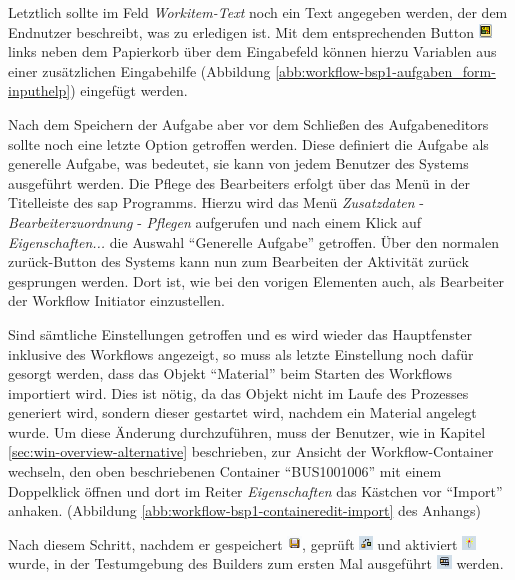 Letztlich sollte im Feld \textit{Workitem-Text} noch ein Text angegeben werden, der dem Endnutzer beschreibt, was zu erledigen ist. Mit dem entsprechenden Button \includegraphics[height=1em]{grafiken/wf-builder_bsp1_formular-aufgabe_btn_eingabehilfe-ausdruck.png} links neben dem Papierkorb über dem Eingabefeld können hierzu Variablen aus einer zusätzlichen Eingabehilfe (Abbildung \ref{abb:workflow-bsp1-aufgaben_form-inputhelp}) eingefügt werden.

Nach dem Speichern der Aufgabe aber vor dem Schließen des Aufgabeneditors sollte noch eine letzte Option getroffen werden. Diese definiert die Aufgabe als generelle Aufgabe, was bedeutet, sie kann von jedem Benutzer des Systems ausgeführt werden. Die Pflege des Bearbeiters erfolgt über das Menü in der Titelleiste des \gls{sap} Programms. Hierzu wird das Menü \textit{Zusatzdaten} - \textit{Bearbeiterzuordnung} - \textit{Pflegen} aufgerufen und nach einem Klick auf \textit{Eigenschaften...} die Auswahl "`Generelle Aufgabe"' getroffen. Über den normalen zurück-Button des Systems kann nun zum Bearbeiten der Aktivität zurück gesprungen werden. Dort ist, wie bei den vorigen Elementen auch, als Bearbeiter der Workflow Initiator einzustellen. 

Sind sämtliche Einstellungen getroffen und es wird wieder das Hauptfenster inklusive des Workflows angezeigt, so muss als letzte Einstellung noch dafür gesorgt werden, dass das Objekt "`Material"' beim Starten des Workflows importiert wird. Dies ist nötig, da das Objekt nicht im Laufe des Prozesses generiert wird, sondern dieser gestartet wird, nachdem ein Material angelegt wurde. Um diese Änderung durchzuführen, muss der Benutzer, wie in Kapitel \ref{sec:win-overview-alternative} beschrieben, zur Ansicht der Workflow-Container wechseln, den oben beschriebenen Container "`BUS1001006"' mit einem Doppelklick öffnen und dort im Reiter \textit{Eigenschaften} das Kästchen vor "`Import"' anhaken. (Abbildung \ref{abb:workflow-bsp1-containeredit-import} des Anhangs)

Nach diesem Schritt, nachdem er gespeichert \includegraphics[height=1em]{grafiken/btn_sap_save.png}, geprüft \includegraphics[height=1em]{grafiken/btn_sap_check.png} und aktiviert \includegraphics[height=1em]{grafiken/btn_sap_activate.png} wurde, in der Testumgebung des Builders zum ersten Mal ausgeführt \includegraphics[height=1em]{grafiken/btn_sap_excecute.png} werden. 

